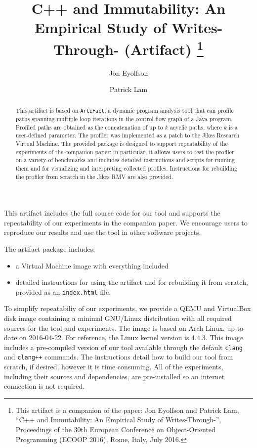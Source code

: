 \documentclass[a4paper,UKenglish]{lipics-v2016}
\title{C++ \const{} and Immutability: An Empirical Study of
       Writes-Through-\const{} (Artifact)
  \footnote{This artifact is a companion of the paper: Jon Eyolfson and Patrick
            Lam, ``C++ \const{} and Immutability: An Empirical Study of
            Writes-Through-\const{}'', Proceedings of the 30th European
            Conference on Object-Oriented Programming (ECOOP 2016), Rome, Italy,
            July 2016.}}
\author[1]{Jon Eyolfson}
\author[2]{Patrick Lam}
\affil[1]{University of Waterloo\\
  Waterloo, ON, Canada\\
  \texttt{jeyolfso@uwaterloo.ca}}
\affil[2]{University of Waterloo\\
  Waterloo ON, Canada\\
  \texttt{patrick.lam@uwaterloo.ca}}
\begin{document}
\maketitle

\begin{abstract}
  This artifact is based on {\tt ArtiFact}, a dynamic program analysis tool that
  can profile paths spanning multiple loop iterations in the control flow
  graph of a Java program. Profiled paths are obtained as the concatenation of
  up to $k$ acyclic paths, where $k$ is a user-defined parameter. The profiler was
  implemented as a patch to the Jikes Research Virtual Machine. The provided
  package is designed to support repeatability of the experiments of the
  companion paper: in particular, it allows users to test the profiler on a variety of
  benchmarks and includes detailed instructions and scripts for running them
  and for visualizing and interpreting collected profiles. Instructions for
  rebuilding the profiler from scratch in the Jikes RMV are also provided.
 \end{abstract}

\begin{scope}
  This artifact includes the full source code for our tool and supports the
  repeatability of our experiments in the companion paper. We encourage users
  to reproduce our results and use the tool in other software projects.
\end{scope}

\begin{content}
  The artifact package includes:
  \begin{itemize}
    \item a Virtual Machine image with everything included
    \item detailed instructions for using the artifact and for rebuilding it
          from scratch, provided as an {\tt index.html} file.
  \end{itemize}

  To simplify repeatabiliy of our experiments, we provide a QEMU and VirtualBox
  disk image containing a minimal GNU/Linux distribution with all required
  sources for the tool and experiments. The image is based on Arch Linux,
  up-to-date on 2016-04-22. For reference, the Linux kernel version is 4.4.3.
  This image includes a pre-compiled version of our tool available through the
  default \texttt{clang} and \texttt{clang++} commands. The instructions detail
  how to build our tool from scratch, if desired, however it is time consuming.
  All of the experiments, including their sources and dependencies, are
  pre-installed so an internet connection is not required.
\end{content} 
\end{document}

